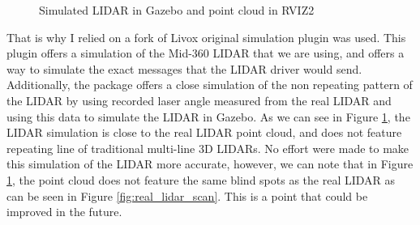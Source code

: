 \documentclass[12pt]{article}
\begin{document}
                \begin{figure}[H]
                    \centering
                    \caption{Simulated LIDAR in Gazebo and point cloud in RVIZ2}
                    \label{fig:lidar_simulation}
                \end{figure}
        
        That is why I relied on a fork \cite{livox_laser_simulation_RO2} of Livox original simulation plugin was used. This plugin offers a simulation of the Mid-360 LIDAR that we are using, and offers a way to simulate the exact messages that the LIDAR driver would send. Additionally, the package offers a close simulation of the non repeating pattern of the LIDAR by using recorded laser angle measured from the real LIDAR and using this data to simulate the LIDAR in Gazebo. As we can see in Figure \ref{fig:lidar_simulation}, the LIDAR simulation is close to the real LIDAR point cloud, and does not feature repeating line of traditional multi-line 3D LIDARs. No effort were made to make this simulation of the LIDAR more accurate, however, we can note that in Figure \ref{fig:lidar_simulation}, the point cloud does not feature the same blind spots as the real LIDAR as can be seen in Figure \ref{fig:real_lidar_scan}. This is a point that could be improved in the future.
\end{document}
